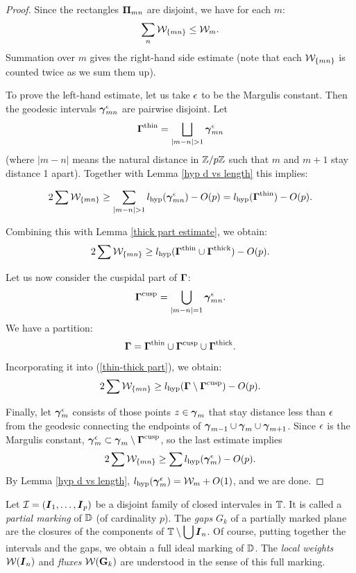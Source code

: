 \begin{proof}
  Since the rectangles ${\boldsymbol{\Pi}}_{mn}$ are disjoint, we have for each $m$: 
$$
    \sum_n {\mathcal W}_{\{mn\}} \leq {\mathcal W}_m.
$$
Summation over $m$ gives the right-hand side estimate (note that each
${\mathcal W}_{ \{mn\} }$ is counted twice as we sum  them  up). 

\msk To prove the left-hand estimate, let us take ${\epsilon}$ to be the
Margulis constant. Then the  geodesic intervals ${\boldsymbol{\gamma}}^{\epsilon}_{mn}$ are
pairwise disjoint.  Let 
$$
   \BGa^\thin = \bigsqcup_{|m-n|>1} \Bga_{mn}^\eps 
$$
(where $|m-n|$ means the natural distance in ${\Bbb Z}/ p{\Bbb Z}$ such that $m$
and $m+1$ stay distance 1 apart).  
Together with Lemma \ref{hyp d vs length} this implies:

$$
     2\sum \WW_{ \{mn\} } \geq \sum_{|m-n|>1} l_\hyp (\Bga_{mn}^\eps ) - O(p)
     =  l_\hyp ( \BGa^\thin  ) - O(p).
$$

Combining this with Lemma \ref{thick part estimate}, we obtain: 
\begin{equation}\label{thin-thick part}
     2\sum {\mathcal W}_{ \{mn\} } \geq   l_{\mathrm{hyp}} ( {\boldsymbol\Gamma}^{\mathrm{thin}} \cup {\boldsymbol\Gamma}^{ \mathrm{thick}} ) - O(p).
\end{equation}


Let us now consider the cuspidal  part of ${\boldsymbol\Gamma}$:  
$$
 {\boldsymbol\Gamma}^{\mathrm{cusp}}=  \bigcup_{|m-n|=1} {\boldsymbol{\gamma}}^{\epsilon}_{mn}.
$$
We have a partition: 
$$
   {\boldsymbol\Gamma} =    {\boldsymbol\Gamma}^{\mathrm{thin}} \cup {\boldsymbol\Gamma}^{\mathrm{cusp}} \cup {\boldsymbol\Gamma}^{ \mathrm{thick}}. 
$$
Incorporating it into (\ref{thin-thick part}), we obtain:
$$
    2\sum {\mathcal W}_{ \{mn\} } \geq   l_{\mathrm{hyp}} ( {\boldsymbol\Gamma}\setminus {\boldsymbol\Gamma}^{\mathrm{cusp}} ) - O(p).
$$

Finally, let ${\boldsymbol{\gamma}}_m^{\epsilon}$ consists of those points $z\in {\boldsymbol{\gamma}}_m$ that
stay distance less than ${\epsilon}$ from the geodesic connecting the
endpoints of ${\boldsymbol{\gamma}}_{m-1}\cup {\boldsymbol{\gamma}}_m \cup {\boldsymbol{\gamma}}_{m+1}$. Since ${\epsilon}$ is
the Margulis constant, ${\boldsymbol{\gamma}}_m^{\epsilon} \subset {\boldsymbol{\gamma}}_m\setminus {\boldsymbol\Gamma}^{\mathrm{cusp}}$, 
so the last estimate implies
$$
       2\sum {\mathcal W}_{ \{mn\} } \geq  \sum  l_{\mathrm{hyp}} ( {\boldsymbol{\gamma}}_m^{\epsilon} ) - O(p).
$$
By Lemma \ref{hyp d vs length},
$ l_{\mathrm{hyp}} ( {\boldsymbol{\gamma}}_m^{\epsilon} ) = {\mathcal W}_m + O(1)$, and we are done.
\end{proof}


Let ${\mathcal I}= ({\boldsymbol{I}}_1, \dots, {\boldsymbol{I}}_p)$ be a disjoint family of closed
intervales in ${\Bbb T}$.
 It is called a {\it partial marking} of ${\Bbb D}$ (of cardinality $p$). 
The {\it gaps} $G_k$  of a partially marked plane are the closures of the
components of $\displaystyle{ {\Bbb T}\setminus\bigcup {\boldsymbol{I}}_n}$. Of course, putting
together the intervals and the gaps, we obtain a full ideal  marking
of ${\Bbb D}$. The {\it local weights} ${\mathcal W}({\boldsymbol{I}}_n)$ and {\it fluxes}
${\mathcal W}({\mathbf{G}}_k)$ are understood in the sense of this full marking.     
 
